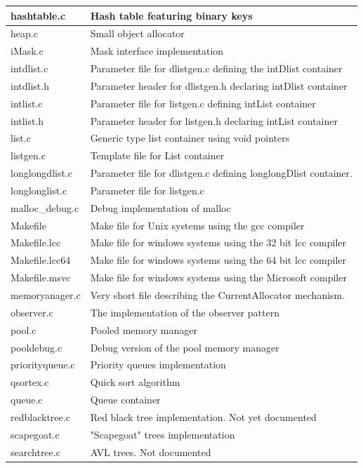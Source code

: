 \documentclass[12pt,a4paper,openany]{memoir} %
\begin{document}
{{{\begin{longtable}{||p{3.5cm}|p{11cm}||}
hashtable.c&Hash table featuring binary keys\\\hline
heap.c&Small object allocator\\\hline
iMask.c&Mask interface implementation\\\hline
intdlist.c&Parameter file for dlistgen.c defining the intDlist container\\\hline
intdlist.h&Parameter header for dlistgen.h declaring intDlist container\\\hline
intlist.c&Parameter file for listgen.c defining intList container\\\hline
intlist.h&Parameter header for listgen.h declaring intList container\\\hline
list.c&Generic type list container using void pointers\\\hline
listgen.c&Template file for List container\\\hline
longlongdlist.c&Parameter file for dlistgen.c defining longlongDlist container.\\\hline
longlonglist.c&Parameter file for listgen.c\\\hline
malloc\_debug.c&Debug implementation of malloc\\\hline
Makefile&Make file for Unix systems using the gcc compiler\\\hline
Makefile.lcc&Make file for windows systems using the 32 bit lcc compiler\\\hline
Makefile.lcc64&Make file for windows systems using the 64 bit lcc compiler\\\hline
Makefile.msvc&Make file for windows systems using the Microsoft compiler\\\hline
memoryanager.c&Very short file describing the CurrentAllocator mechanism.\\\hline
observer.c&The implementation of the observer pattern\\\hline
pool.c&Pooled memory manager\\\hline
pooldebug.c&Debug version of the pool memory manager\\\hline
priorityqueue.c&Priority queues implementation\\\hline
qsortex.c&Quick sort algorithm\\\hline
queue.c&Queue container\\\hline
redblacktree.c&Red black tree implementation. Not yet documented\\\hline
scapegoat.c&"Scapegoat" trees implementation\\\hline
searchtree.c&AVL trees. Not documented\\\hline

\end{longtable}}}}
\end{document}
